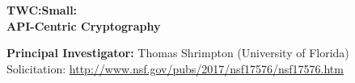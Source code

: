 \documentclass[10pt]{article}
\newcommand{\mytitle}{TWC:Small:\\
  \smallskip API-Centric Cryptography}
\begin{document}
\vspace*{1.0in}
\begin{center}

{\Large\bf \mytitle}

\vspace*{.5in}

\medskip
\noindent\textbf{Principal Investigator:} Thomas Shrimpton (University of Florida)\\


\medskip
Solicitation: \url{http://www.nsf.gov/pubs/2017/nsf17576/nsf17576.htm}

\end{center}
\thispagestyle{empty}

\iffalse

\clearpage
\setcounter{page}{1}


\fi

\clearpage
\renewcommand{\thepage}{D-\arabic{page}}
\setcounter{page}{1}










%





%

\clearpage
\renewcommand{\thepage}{M-\arabic{page}}
\setcounter{page}{1}

\end{document}
